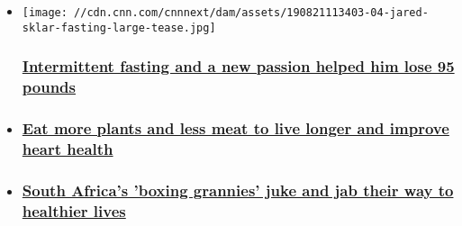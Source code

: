 \begin{itemize}
\item
  \href{/2019/08/26/health/intermittent-fasting-jared-sklar-wellness-live-longer/index.html}{}

  \texttt{[image: //cdn.cnn.com/cnnnext/dam/assets/190821113403-04-jared-sklar-fasting-large-tease.jpg]}

  \hypertarget{intermittent-fasting-and-a-new-passion-helped-him-lose-95-pounds}{%
  \subsubsection{\texorpdfstring{\href{/2019/08/26/health/intermittent-fasting-jared-sklar-wellness-live-longer/index.html}{Intermittent
  fasting and a new passion helped him lose 95
  pounds}}{Intermittent fasting and a new passion helped him lose 95 pounds}}\label{intermittent-fasting-and-a-new-passion-helped-him-lose-95-pounds}}
\item
  \hypertarget{eat-more-plants-and-less-meat-to-live-longer-and-improve-heart-health}{%
  \subsubsection{\texorpdfstring{\href{/2019/08/09/health/plant-based-diet-heart-disease-study/index.html}{Eat
  more plants and less meat to live longer and improve heart
  health}}{Eat more plants and less meat to live longer and improve heart health}}\label{eat-more-plants-and-less-meat-to-live-longer-and-improve-heart-health}}
\item
  \hypertarget{south-africas-boxing-grannies-juke-and-jab-their-way-to-healthier-lives-}{%
  \subsubsection{\texorpdfstring{\href{/2019/02/01/health/boxing-grannies-live-longer/index.html}{South
  Africa's 'boxing grannies' juke and jab their way to healthier lives
  }}{South Africa's 'boxing grannies' juke and jab their way to healthier lives }}\label{south-africas-boxing-grannies-juke-and-jab-their-way-to-healthier-lives-}}
\end{itemize}

